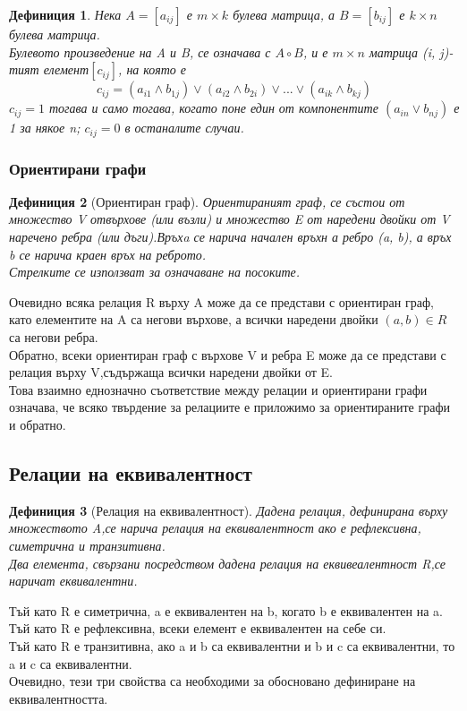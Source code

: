 \documentclass[fleqn, 12pt]{article}
\newtheorem{definition}{Дефиниция}[subsection]
\begin{document}
\begin{definition}
Нека $A = [a_{ij}]$ е $m \times k$ булева матрица, а $B = [b_{ij}]$ е $k \times n$ булева матрица.\\
Булевото произведение на A и B, се означава с $A \circ B$, и е $m\times n$ матрица (i, j)-тият елемент$[c_{ij}]$, на която е 
$$c_{ij}= (a_{i1}\land b_{1j}) \lor (a_{i2}\land b_{2i}) \lor ... \lor (a_{ik} \land b_{kj})$$
$c_{ij} = 1$ тогава и само тогава, когато поне един от компонентите $(a_{in}\lor b_{nj})$ е 1 за някое n; $c_{ij}= 0$ в останалите случаи.
\end{definition}

\subsubsection{Ориентирани графи}

\begin{definition}[Ориентиран граф]
Ориентираният граф, се състои от множество V отвърхове (или възли) и множество E от наредени двойки от V наречено ребра (или дъги).Връхa се нарича начален връхн а ребро (a, b), а връх b се нарича краен връх на реброто. \\
Стрелките се използват за означаване на посоките.
\end{definition}
Очевидно всяка релация R върху A може да се представи с ориентиран граф, като елементите на A са негови върхове, а всички наредени двойки $(a, b) \in R$ са негови ребра.\\
Обратно, всеки ориентиран граф с върхове V и ребра E може да се представи с релация върху V,съдържаща всички наредени двойки от E.\\
Това взаимно еднозначно съответствие между релации и ориентирани графи означава, че всяко твърдение за релациите е приложимо за ориентираните графи и обратно.

\subsection{Релации на еквивалентност}

\begin{definition}[Релация на еквивалентност]
Дадена релация, дефинирана върху множеството A,се нарича релация на еквивалентност ако е рефлексивна, симетрична и транзитивна. \\
Два елемента, свързани посредством дадена релация на еквивеалентност R,се наричат еквивалентни.
\end{definition}
Тъй като R е симетрична, a е еквивалентен на b, когато b е еквивалентен на a.\\
Тъй като R е рефлексивна, всеки елемент е еквивалентен на себе си.\\
Тъй като R е транзитивна, ако a и b са еквивалентни и b и c са еквивалентни, то a и c са еквивалентни.\\
Очевидно, тези три свойства са необходими за обосновано дефиниране на еквивалентността.
\end{document}
